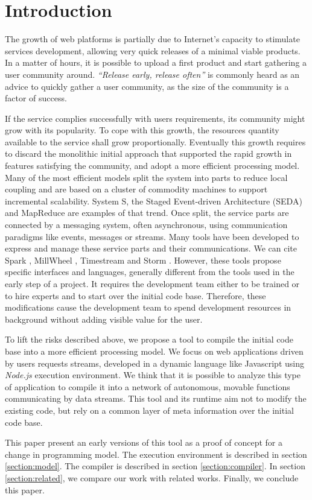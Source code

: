 \section{Introduction}

The growth of web platforms is partially due to Internet's capacity to stimulate services development, allowing very quick releases of a minimal viable products.
In a matter of hours, it is possible to upload a first product and start gathering a user community around.
\textit{``Release early, release often''} is commonly heard as an advice to quickly gather a user community, as the size of the community is a factor of success.

If the service complies successfully with users requirements, its community might grow with its popularity.
To cope with this growth, the resources quantity available to the service shall grow proportionally.
Eventually this growth requires to discard the monolithic initial approach that supported the rapid growth in features satisfying the community, and adopt a more efficient processing model.
Many of the most efficient models split the system into parts to reduce local coupling and are based on a cluster of commodity machines\cite{Fox1997} to support incremental scalability.
System S\cite{Jain2006,Wu2007}, the Staged Event-driven Architecture (SEDA)\cite{Welsh2000} and MapReduce \cite{Dean2008} are examples of that trend.
Once split, the service parts are connected by a messaging system, often asynchronous, using communication paradigms like events, messages or streams.
Many tools have been developed to express and manage these service parts and their communications.
We can cite Spark \cite{Zaharia2010}, MillWheel \cite{Akidau2013}, Timestream \cite{Qian2013} and Storm \cite{Marz2011}.
However, these tools propose specific interfaces and languages, generally different from the tools used in the early step of a project.
It requires the development team either to be trained or to hire experts and to start over the initial code base.
Therefore, these modifications cause the development team to spend development resources in background without adding visible value for the user.

To lift the risks described above, we propose a tool to compile the initial code base into a more efficient processing model.
We focus on web applications driven by users requests streams, developed in a dynamic language like Javascript using \textit{Node.js} execution environment.
We think that it is possible to analyze this type of application to compile it into a network of autonomous, movable functions communicating by data streams.
This tool and its runtime aim not to modify the existing code, but rely on a common layer of meta information over the initial code base.

This paper present an early versions of this tool as a proof of concept for a change in programming model.
The execution environment is described in section \ref{section:model}.
The compiler is described in section \ref{section:compiler}.
In section \ref{section:related}, we compare our work with related works.
Finally, we conclude this paper.